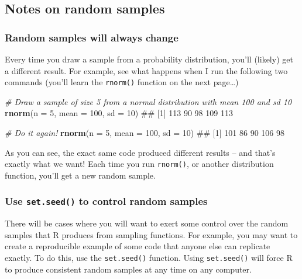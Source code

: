 \documentclass[]{book}
\newenvironment{Shaded}{\begin{snugshade}}{\end{snugshade}}
\newcommand{\KeywordTok}[1]{\textcolor[rgb]{0.13,0.29,0.53}{\textbf{{#1}}}}
\newcommand{\DataTypeTok}[1]{\textcolor[rgb]{0.13,0.29,0.53}{{#1}}}
\newcommand{\DecValTok}[1]{\textcolor[rgb]{0.00,0.00,0.81}{{#1}}}
\newcommand{\CommentTok}[1]{\textcolor[rgb]{0.56,0.35,0.01}{\textit{{#1}}}}
\newcommand{\NormalTok}[1]{{#1}}
\theoremstyle{definition}
\theoremstyle{definition}
\theoremstyle{remark}
\begin{document}
\subsection{Notes on random samples}\label{notes-on-random-samples}

\subsubsection{Random samples will always
change}\label{random-samples-will-always-change}

Every time you draw a sample from a probability distribution, you'll
(likely) get a different result. For example, see what happens when I
run the following two commands (you'll learn the \texttt{rnorm()}
function on the next page\ldots{})

\begin{Shaded}
\begin{Highlighting}[]
\CommentTok{# Draw a sample of size 5 from a normal distribution with mean 100 and sd 10}
\KeywordTok{rnorm}\NormalTok{(}\DataTypeTok{n =} \DecValTok{5}\NormalTok{, }\DataTypeTok{mean =} \DecValTok{100}\NormalTok{, }\DataTypeTok{sd =} \DecValTok{10}\NormalTok{)}
\NormalTok{## [1] 113  90  98 109 113}

\CommentTok{# Do it again!}
\KeywordTok{rnorm}\NormalTok{(}\DataTypeTok{n =} \DecValTok{5}\NormalTok{, }\DataTypeTok{mean =} \DecValTok{100}\NormalTok{, }\DataTypeTok{sd =} \DecValTok{10}\NormalTok{)}
\NormalTok{## [1] 101  86  90 106  98}
\end{Highlighting}
\end{Shaded}

As you can see, the exact same code produced different results -- and
that's exactly what we want! Each time you run \texttt{rnorm()}, or
another distribution function, you'll get a new random sample.

\subsubsection{\texorpdfstring{Use \texttt{set.seed()} to control random
samples}{Use set.seed() to control random samples}}\label{use-set.seed-to-control-random-samples}

There will be cases where you will want to exert some control over the
random samples that R produces from sampling functions. For example, you
may want to create a reproducible example of some code that anyone else
can replicate exactly. To do this, use the \texttt{set.seed()} function.
Using \texttt{set.seed()} will force R to produce consistent random
samples at any time on any computer.
\end{document}
